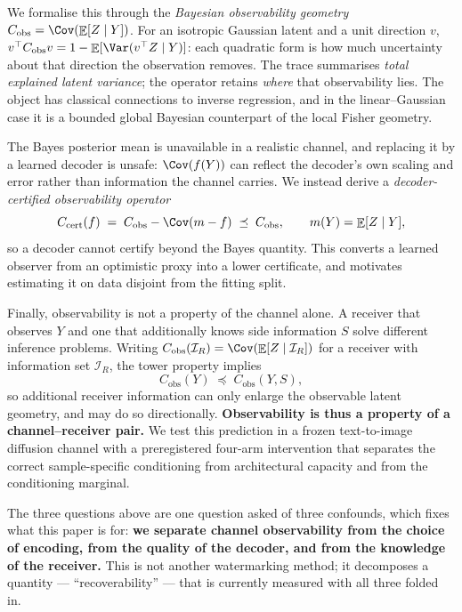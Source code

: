 \documentclass{article}
\theoremstyle{definition}
\DeclareMathOperator{\Exp}{\mathbb{E}}
\newcommand{\Cobs}{C_{\mathrm{obs}}}
\newcommand{\Ccert}{C_{\mathrm{cert}}}
\begin{document}
We formalise this through the \emph{Bayesian observability geometry}
$\Cobs=\Cov(\Exp[Z\mid Y])$. For an isotropic Gaussian latent and a unit direction $v$,
$v^\top\Cobs v=1-\Exp[\Var(v^\top Z\mid Y)]$: each quadratic form is how much uncertainty
about that direction the observation removes. The trace summarises \emph{total explained
latent variance}; the operator retains \emph{where} that observability lies. The object
has classical connections to inverse regression, and in the linear--Gaussian case it is a
bounded global Bayesian counterpart of the local Fisher geometry.

The Bayes posterior mean is unavailable in a realistic channel, and replacing it by a
learned decoder is unsafe: $\Cov(f(Y))$ can reflect the decoder's own scaling and error
rather than information the channel carries. We instead derive a \emph{decoder-certified
observability operator}
\[
  \Ccert(f)\;=\;\Cobs-\Cov(m-f)\;\preceq\;\Cobs,\qquad m(Y)=\Exp[Z\mid Y],
\]
so a decoder cannot certify beyond the Bayes quantity. This converts a learned observer
from an optimistic proxy into a lower certificate, and motivates estimating it on data
disjoint from the fitting split.

Finally, observability is not a property of the channel alone. A receiver that observes
$Y$ and one that additionally knows side information $S$ solve different inference
problems. Writing $\Cobs(\mathcal I_R)=\Cov(\Exp[Z\mid\mathcal I_R])$ for a receiver with
information set $\mathcal I_R$, the tower property implies
\[
  \Cobs(Y)\;\preceq\;\Cobs(Y,S),
\]
so additional receiver information can only enlarge the observable latent geometry, and
may do so directionally. \textbf{Observability is thus a property of a channel--receiver
pair.} We test this prediction in a frozen text-to-image diffusion channel with a
preregistered four-arm intervention that separates the correct sample-specific
conditioning from architectural capacity and from the conditioning marginal.

The three questions above are one question asked of three confounds, which fixes what this
paper is for: \textbf{we separate channel observability from the choice of encoding, from
the quality of the decoder, and from the knowledge of the receiver.} This is not another
watermarking method; it decomposes a quantity --- ``recoverability'' --- that is currently
measured with all three folded in.
\end{document}
